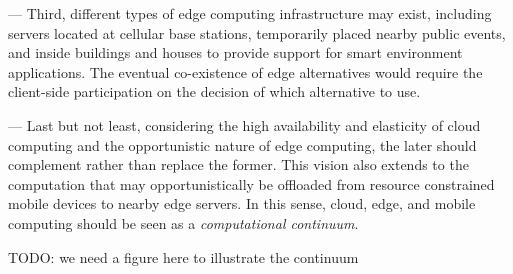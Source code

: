 
--- Third, different types of edge computing infrastructure may exist, including servers located at cellular base stations, temporarily placed nearby public events, and inside buildings and houses to provide support for smart environment applications. The eventual co-existence of edge alternatives would require the client-side participation on the decision of which alternative to use.

--- Last but not least, considering the high availability and elasticity of cloud computing and the opportunistic nature of edge computing, the later should complement rather than replace the former. This vision also extends to the computation that may opportunistically be offloaded from resource constrained mobile devices to nearby edge servers. In this sense, cloud, edge, and mobile computing should be seen as a \textit{computational continuum}.

TODO: we need a figure here to illustrate the continuum
 





